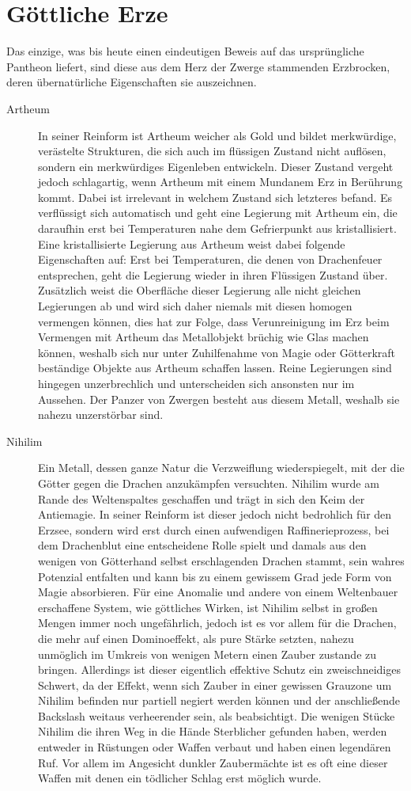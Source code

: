 \documentclass[a4paper,12pt,oneside]{book}
\begin{document}
\section{Göttliche Erze}
Das einzige, was bis heute einen eindeutigen Beweis auf das ursprüngliche Pantheon liefert, sind diese aus dem Herz der Zwerge stammenden Erzbrocken, deren übernatürliche Eigenschaften sie auszeichnen.
\begin{description}
\item[Artheum]In seiner Reinform ist Artheum weicher als Gold und bildet merkwürdige, verästelte Strukturen, die sich auch im flüssigen Zustand nicht auflösen, sondern ein merkwürdiges Eigenleben entwickeln. Dieser Zustand vergeht jedoch schlagartig, wenn Artheum mit einem Mundanem Erz in Berührung kommt. Dabei ist irrelevant in welchem Zustand sich letzteres befand. Es verflüssigt sich automatisch und geht eine Legierung mit Artheum ein, die daraufhin erst bei Temperaturen nahe dem Gefrierpunkt aus kristallisiert. Eine kristallisierte Legierung aus Artheum weist dabei folgende Eigenschaften auf: Erst bei Temperaturen, die denen von Drachenfeuer entsprechen, geht die Legierung wieder in ihren Flüssigen Zustand über. Zusätzlich weist die Oberfläche dieser Legierung alle nicht gleichen Legierungen ab und wird sich daher niemals mit diesen homogen vermengen können, dies hat zur Folge, dass Verunreinigung im Erz beim Vermengen mit Artheum das Metallobjekt brüchig wie Glas machen können, weshalb sich nur unter Zuhilfenahme von Magie oder Götterkraft beständige Objekte aus Artheum schaffen lassen. Reine Legierungen sind hingegen unzerbrechlich und unterscheiden sich ansonsten nur im Aussehen. Der Panzer von Zwergen besteht aus diesem Metall, weshalb sie nahezu unzerstörbar sind.
\item[Nihilim]Ein Metall, dessen ganze Natur die Verzweiflung wiederspiegelt, mit der die Götter gegen die Drachen anzukämpfen versuchten. Nihilim wurde am Rande des Weltenspaltes geschaffen und trägt in sich den Keim der Antiemagie. In seiner Reinform ist dieser jedoch nicht bedrohlich für den Erzsee, sondern wird erst durch einen aufwendigen Raffinerieprozess, bei dem Drachenblut eine entscheidene Rolle spielt und damals aus den wenigen von Götterhand selbst erschlagenden Drachen stammt, sein wahres Potenzial entfalten und kann bis zu einem gewissem Grad jede Form von Magie absorbieren. Für eine Anomalie und andere von einem Weltenbauer erschaffene System, wie göttliches Wirken, ist Nihilim selbst in großen Mengen immer noch ungefährlich, jedoch ist es vor allem für die Drachen, die mehr auf einen Dominoeffekt, als pure Stärke setzten, nahezu unmöglich im Umkreis von wenigen Metern einen Zauber zustande zu bringen. Allerdings ist dieser eigentlich effektive Schutz ein zweischneidiges Schwert, da der Effekt, wenn sich Zauber in einer gewissen Grauzone um Nihilim befinden nur partiell negiert werden können und der anschließende Backslash weitaus verheerender sein, als beabsichtigt. Die wenigen Stücke Nihilim die ihren Weg in die Hände Sterblicher gefunden haben, werden entweder in Rüstungen oder Waffen verbaut und haben einen legendären Ruf. Vor allem im Angesicht dunkler Zaubermächte ist es oft eine dieser Waffen mit denen ein tödlicher Schlag erst möglich wurde.
\end{description}
\end{document}
